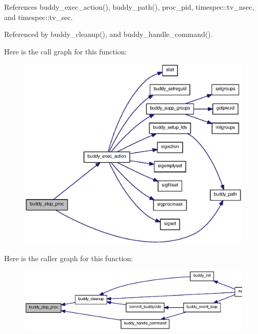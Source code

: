 References buddy\_\-exec\_\-action(), buddy\_\-path(), proc\_\-pid, timespec::tv\_\-nsec, and timespec::tv\_\-sec.



Referenced by buddy\_\-cleanup(), and buddy\_\-handle\_\-command().



Here is the call graph for this function:
\nopagebreak
\begin{figure}[H]
\begin{center}
\leavevmode
\includegraphics[width=400pt]{buddy_8c_a4b1edbdc726789da8ca825d76581b68f_cgraph}
\end{center}
\end{figure}




Here is the caller graph for this function:\nopagebreak
\begin{figure}[H]
\begin{center}
\leavevmode
\includegraphics[width=400pt]{buddy_8c_a4b1edbdc726789da8ca825d76581b68f_icgraph}
\end{center}
\end{figure}


